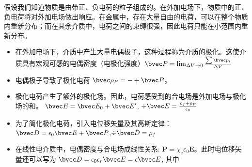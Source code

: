 
假设我们知道物质是由带正、负电荷的粒子组成的。在外加电场下，物质中的正、负电荷将对外加电场做出响应。在金属中，存在大量自由的电荷，可以在整个物质内重新分布；而在其余介质中，电荷之间的束缚很强，因此电荷只能在小范围内重新分布。

\begin{itemize}
\item 在外加电场下，介质中产生大量电偶极子，这种过程称为介质的极化。这使介质具有宏观可感的电偶密度（电极化强度）$\bvec P = \lim_{\Delta V \to 0} \frac{\sum \bvec p_i}{\Delta V}$ 
\item 电偶极子导致了极化电荷 $\bvec \rho_P = - \div \bvec P$。
\item 极化电荷产生了额外的极化场。因此，电荷感受到的合电场是外加电场与极化场的和。 $\bvec E = \bvec E_0 + \bvec E'$, $\div \bvec E = \frac{\rho_f+\rho_P}{\epsilon_0}$
\item 为了简化极化电荷，引入电位移矢量及其高斯定律：$\bvec D = \epsilon_0 \bvec E + \bvec P$,$\div \bvec D = \rho_f$
\item 在线性电介质中，电偶密度与合电场成线性关系: $\mathbf P=\chi_{\mathrm e} \varepsilon_{0} \mathbf E$。此时电位移矢量还可以写为 $\bvec D = \epsilon_0 \epsilon_r \bvec E = \epsilon \bvec E $, 其中
\end{itemize}
